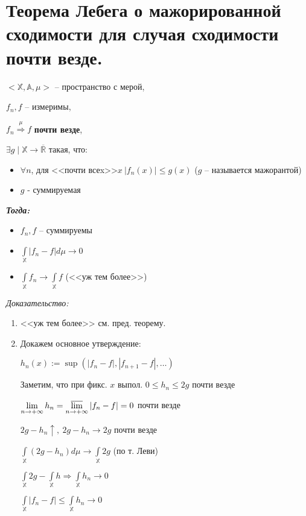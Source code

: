 \documentclass[paper=a4, fontsize=13.2pt]{article}
\begin{document}
\section{Теорема Лебега о мажорированной сходимости для случая сходимости почти везде.}
$<\mathds{X}, \mathds{A}, \mu>$ -- пространство с мерой,

$f_n, f$ -- измеримы,

$f_n\stackrel{\mu}{\Rightarrow}f$ \textbf{почти везде},

$\exists g \mid \mathds{X} \rightarrow \overline{\mathds{R}}$ такая, что:
\begin{itemize}
\item
$\forall n$,  для <<почти всеx>>$x ~ |f_n(x)| \leq g(x)$ ($g$ -- называется мажорантой)
\item
$g$ - суммируемая
\end{itemize}

\emph{\textbf{Тогда:}}
\begin{itemize}
    \item $f_n, f$ -- суммируемы
    \item $\int\limits_{\mathds{X}} |f_n - f| d\mu \rightarrow 0$
    \item $\int\limits_{\mathds{X}} f_n \rightarrow \int\limits_{\mathds{X}} f$ (<<уж тем более>>)
\end{itemize}

\emph{Доказательство:} 

\begin{enumerate}
	\item <<уж тем более>> см. пред. теорему.
	
	\item Докажем основное утверждение: 
	
	$ h_n(x) := \sup(|f_n - f|, |f_{n+1} - f|, \dots) $ 
	
	Заметим, что при фикс. $ x $ выпол. $ 0 \leq h_n \leq 2g $ почти везде
	
	$ \lim\limits_{n \rightarrow +\infty} h_n = 
	\varlimsup\limits_{n \rightarrow +\infty} |f_n - f| = 0 $ почти везде
	 
	$ 2g - h_n \uparrow , ~ 2g - h_n \rightarrow 2g$ почти везде 
	
	$ \int\limits_{\mathds{X}}(2g - h_n) d\mu \rightarrow \int\limits_{\mathds{X}} 2g $ 
	(по т. Леви)
	
	$ \int\limits_{\mathds{X}} 2g - \int\limits_{\mathds{X}} h \Rightarrow \int\limits_{\mathds{X}} h_n \rightarrow 0 $
	
	$ \int\limits_{\mathds{X}} |f_n - f| \leq \int\limits_{\mathds{X}} h_n \rightarrow 0 $
\end{enumerate}
\end{document}
